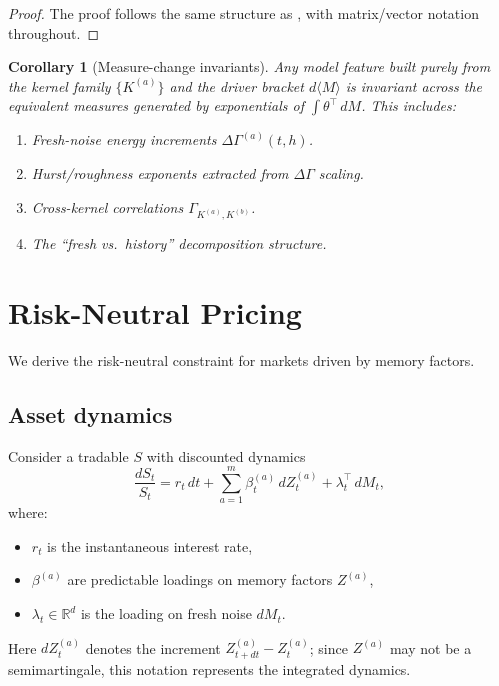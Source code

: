 \documentclass[11pt]{article}
\theoremstyle{plain}
\newtheorem{corollary}{Corollary}[section]
\theoremstyle{definition}
\theoremstyle{remark}
\newcommand{\R}{\mathbb{R}}
\newcommand{\dGamma}{\Delta\Gamma}
\newcommand{\bracket}[1]{\langle #1 \rangle}
\begin{document}
\begin{proof}
The proof follows the same structure as , with
matrix/vector notation throughout.
\end{proof}

\begin{corollary}[Measure-change invariants]\label{cor:invariants}
Any model feature built purely from the kernel family $\{K^{(a)}\}$ and
the driver bracket $d\bracket{M}$ is invariant across the equivalent
measures generated by exponentials of $\int \theta^\top\,dM$. This includes:
\begin{enumerate}[label=(\alph*)]
\item Fresh-noise energy increments $\dGamma^{(a)}(t,h)$.
\item Hurst/roughness exponents extracted from $\dGamma$ scaling.
\item Cross-kernel correlations $\Gamma_{K^{(a)}, K^{(b)}}$.
\item The ``fresh vs.\ history'' decomposition structure.
\end{enumerate}
\end{corollary}

\section{Risk-Neutral Pricing}\label{sec:finance}

We derive the risk-neutral constraint for markets driven by memory factors.

\subsection{Asset dynamics}

Consider a tradable $S$ with discounted dynamics
\begin{equation}\label{eq:S-dynamics}
\frac{dS_t}{S_t} = r_t\,dt + \sum_{a=1}^m \beta_t^{(a)}\,dZ_t^{(a)} + \lambda_t^\top\,dM_t,
\end{equation}
where:
\begin{itemize}
\item $r_t$ is the instantaneous interest rate,
\item $\beta^{(a)}$ are predictable loadings on memory factors $Z^{(a)}$,
\item $\lambda_t \in \R^d$ is the loading on fresh noise $dM_t$.
\end{itemize}
Here $dZ_t^{(a)}$ denotes the increment $Z_{t+dt}^{(a)} - Z_t^{(a)}$; since $Z^{(a)}$
may not be a semimartingale, this notation represents the integrated dynamics.
\end{document}
